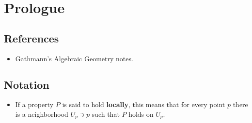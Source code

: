 \newpage

\tableofcontents
\newpage

\hypertarget{prologue}{%
\section*{Prologue}\label{prologue}}

\hypertarget{references}{%
\subsection{References}\label{references}}

\begin{itemize}
\tightlist
\item
  Gathmann's Algebraic Geometry notes\autocite{AndreasGathmann515}.
\end{itemize}

\hypertarget{notation}{%
\subsection{Notation}\label{notation}}

\begin{itemize}
\tightlist
\item
  If a property \(P\) is said to hold \textbf{locally}, this means that
  for every point \(p\) there is a neighborhood \(U_p \ni p\) such that
  \(P\) holds on \(U_p\).
\end{itemize}

